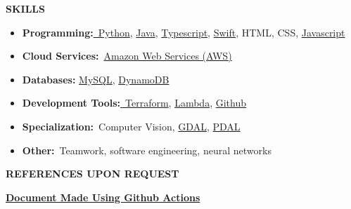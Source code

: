\textbf{SKILLS}

\begin{itemize}
\item
  \textbf{Programming:}\href{https://www.python.org/}{~Python},
  \href{https://www.java.com/en/}{Java},
  \href{https://www.typescriptlang.org/}{Typescript},
  \href{https://www.swift.org/}{Swift}, HTML, CSS,
  \href{https://www.javascript.com/}{Javascript}
\item
  \textbf{Cloud
  Services:}~\href{https://aws.amazon.com/free/?gclid=CjwKCAiAiOa9BhBqEiwABCdG8xJm7dpo0Ifa4i8UYcSexU289wg1I5QgB0YQaTpD3Cc5l3oCR2H94hoCvTYQAvD_BwE\&trk=6a4c3e9d-cdc9-4e25-8dd9-2bd8d15afbca\&sc_channel=ps\&ef_id=CjwKCAiAiOa9BhBqEiwABCdG8xJm7dpo0Ifa4i8UYcSexU289wg1I5QgB0YQaTpD3Cc5l3oCR2H94hoCvTYQAvD_BwE:G:s\&s_kwcid=AL!4422!3!651751059777!e!!g!!amazon\%20web\%20services!19852662197!145019195737\&all-free-tier.sort-by=item.additionalFields.SortRank\&all-free-tier.sort-order=asc\&awsf.Free\%20Tier\%20Types=*all\&awsf.Free\%20Tier\%20Categories=*all}{Amazon
  Web Services (AWS)}
\item
  \textbf{Databases:} \href{https://www.mysql.com/}{MySQL},
  \href{https://aws.amazon.com/dynamodb/}{DynamoDB}
\item
  \textbf{Development
  Tools:}\href{https://developer.hashicorp.com/terraform/language}{~Terraform},
  \href{https://aws.amazon.com/pm/lambda/?gclid=CjwKCAiAiOa9BhBqEiwABCdG8_-jcsK9i3KVP2t5NgupDXinpyF36M-7OgfzGPhJI0F8zaahD0sMmBoC8NIQAvD_BwE\&trk=e0e0d4be-47fe-4336-ab69-7eece7f3d36e\&sc_channel=ps\&ef_id=CjwKCAiAiOa9BhBqEiwABCdG8_-jcsK9i3KVP2t5NgupDXinpyF36M-7OgfzGPhJI0F8zaahD0sMmBoC8NIQAvD_BwE:G:s\&s_kwcid=AL!4422!3!652240143523!e!!g!!amazon\%20lambda!19878797032!147151597893}{Lambda},
  \href{https://github.com/}{Github}
\item
  \textbf{Specialization:}~Computer Vision,
  \href{https://gdal.org/en/stable/}{GDAL},
  \href{https://pdal.io/en/2.8.4/}{PDAL}
\item
  \textbf{Other:}~Teamwork, software engineering, neural networks
\end{itemize}

\textbf{REFERENCES UPON REQUEST}

\href{http://github.com/TomTheTonk/Resume}{\textbf{Document Made Using
Github Actions}}
